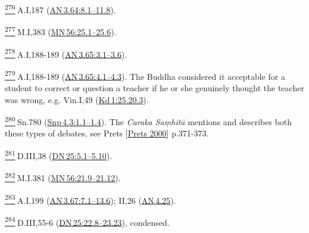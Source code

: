 \label{footprints_split_024.html_fn276}
\hyperref[footprints_split_010.htmlux5cux23fnref276]{\textsuperscript{276}} A.I,187
(\href{https://suttacentral.net/an3.64/en/sujato\#8.1}{AN\,3.64:8.1--11.8}).

\label{footprints_split_024.html_fn277}
\hyperref[footprints_split_010.htmlux5cux23fnref277]{\textsuperscript{277}} M.I,383
(\href{https://suttacentral.net/mn56/en/sujato\#25.1}{MN\,56:25.1--25.6}).

\label{footprints_split_024.html_fn278}
\hyperref[footprints_split_010.htmlux5cux23fnref278]{\textsuperscript{278}} A.I,188-189
(\href{https://suttacentral.net/an3.65/en/sujato\#3.1}{AN\,3.65:3.1--3.6}).

\label{footprints_split_024.html_fn279}
\hyperref[footprints_split_010.htmlux5cux23fnref279]{\textsuperscript{279}} A.I,188-189
(\href{https://suttacentral.net/an3.65/en/sujato\#4.1}{AN\,3.65:4.1--4.3}).
The Buddha considered it acceptable for a student to correct or question
a teacher if he or she genuinely thought the teacher was wrong, e.g.
Vin.I,49
(\href{https://suttacentral.net/pli-tv-kd1/en/brahmali\#25.20.3}{Kd\,1:25.20.3}).

\label{footprints_split_024.html_fn280}
\hyperref[footprints_split_010.htmlux5cux23fnref280]{\textsuperscript{280}} Sn.780
(\href{https://suttacentral.net/snp4.3/en/sujato\#1.1}{Snp\,4.3:1.1--1.4}).
The \emph{Caraka Saṃhitā} mentions and describes both these types of
debates, see {Prets
{{[}\hyperref[footprints_split_022.htmlux5cux23Pretsux5cux25202000]{Prets
2000}{]}}} p.371-373.

\label{footprints_split_024.html_fn281}
\hyperref[footprints_split_010.htmlux5cux23fnref281]{\textsuperscript{281}} D.III,38
(\href{https://suttacentral.net/dn25/en/sujato\#5.1}{DN\,25:5.1--5.10}).

\label{footprints_split_024.html_fn282}
\hyperref[footprints_split_010.htmlux5cux23fnref282]{\textsuperscript{282}} M.I.381
(\href{https://suttacentral.net/mn56/en/sujato\#21.9}{MN\,56:21.9--21.12}).

\label{footprints_split_024.html_fn283}
\hyperref[footprints_split_010.htmlux5cux23fnref283]{\textsuperscript{283}} A.I,199
(\href{https://suttacentral.net/an3.67/en/sujato\#7.1}{AN\,3.67:7.1--13.6});
II,26 (\href{https://suttacentral.net/an4.25/en/sujato}{AN\,4.25}).

\label{footprints_split_024.html_fn284}
\hyperref[footprints_split_010.htmlux5cux23fnref284]{\textsuperscript{284}} D.III,55-6
(\href{https://suttacentral.net/dn25/en/sujato\#22.8}{DN\,25:22.8--23.23}),
condensed.

